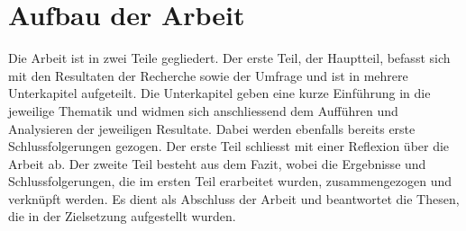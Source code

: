\section{Aufbau der Arbeit}

Die Arbeit ist in zwei Teile gegliedert. 
Der erste Teil, der Hauptteil, befasst sich mit den Resultaten der Recherche sowie der Umfrage und ist in mehrere Unterkapitel aufgeteilt. Die Unterkapitel geben eine kurze Einführung in die jeweilige Thematik und widmen sich anschliessend dem Aufführen und Analysieren der jeweiligen Resultate. Dabei werden ebenfalls bereits erste Schlussfolgerungen gezogen. Der erste Teil schliesst mit einer Reflexion über die Arbeit ab. 
Der zweite Teil besteht aus dem Fazit, wobei die Ergebnisse und Schlussfolgerungen, die im ersten Teil erarbeitet wurden, zusammengezogen und verknüpft werden. Es dient als Abschluss der Arbeit und beantwortet die Thesen, die in der Zielsetzung aufgestellt wurden.